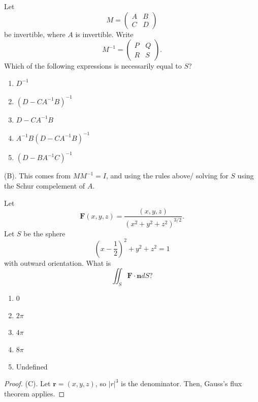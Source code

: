 \begin{exercise}
Let
\[
M=\begin{pmatrix} A & B\\ C & D \end{pmatrix}
\]
be invertible, where $A$ is invertible. Write
\[
M^{-1}=\begin{pmatrix} P & Q\\ R & S \end{pmatrix}.
\]
Which of the following expressions is necessarily equal to $S$?
\begin{enumerate}[label=(\Alph*)]
    \item $D^{-1}$
    \item $(D-CA^{-1}B)^{-1}$
    \item $D-CA^{-1}B$
    \item $A^{-1}B(D-CA^{-1}B)^{-1}$
    \item $(D-BA^{-1}C)^{-1}$
\end{enumerate}
\end{exercise}
\begin{solution}
(B). This comes from $MM^{-1} = I$, and using the rules above/ solving for $S$ 
using the Schur compelement of $A$.
\end{solution}

\begin{exercise}
Let
\[
\mathbf F(x,y,z)=\frac{(x,y,z)}{(x^2+y^2+z^2)^{3/2}}.
\]
Let $S$ be the sphere
\[
\left(x-\frac12\right)^2+y^2+z^2=1
\]
with outward orientation. What is
\[
\iint_S \mathbf F\cdot\mathbf n dS?
\]
\begin{enumerate}[label=(\Alph*)]
    \item $0$
    \item $2\pi$
    \item $4\pi$
    \item $8\pi$
    \item Undefined
\end{enumerate}
\end{exercise}
\begin{proof}
(C). Let $\mathbf{r} = (x,y,z)$, so $|r|^3$ is the denominator. Then, Gauss's flux theorem applies.
\end{proof}

